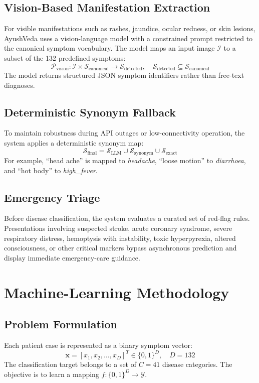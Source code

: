 \documentclass[conference]{IEEEtran}
\begin{document}
\subsection{Vision-Based Manifestation Extraction}
For visible manifestations such as rashes, jaundice, ocular redness, or skin lesions, AyushVeda uses a vision-language model with a constrained prompt restricted to the canonical symptom vocabulary. The model maps an input image $\mathcal{I}$ to a subset of the 132 predefined symptoms:
\begin{equation}
\mathcal{P}_{\text{vision}}: \mathcal{I} \times \mathcal{S}_{\text{canonical}} \rightarrow \mathcal{S}_{\text{detected}}, \quad \mathcal{S}_{\text{detected}} \subseteq \mathcal{S}_{\text{canonical}}
\end{equation}
The model returns structured JSON symptom identifiers rather than free-text diagnoses.

\subsection{Deterministic Synonym Fallback}
To maintain robustness during API outages or low-connectivity operation, the system applies a deterministic synonym map:
\begin{equation}
\mathcal{S}_{\text{final}} = \mathcal{S}_{\text{LLM}} \cup \mathcal{S}_{\text{synonym}} \cup \mathcal{S}_{\text{exact}}
\end{equation}
For example, ``head ache'' is mapped to \textit{headache}, ``loose motion'' to \textit{diarrhoea}, and ``hot body'' to \textit{high\_fever}.

\subsection{Emergency Triage}
Before disease classification, the system evaluates a curated set of red-flag rules. Presentations involving suspected stroke, acute coronary syndrome, severe respiratory distress, hemoptysis with instability, toxic hyperpyrexia, altered consciousness, or other critical markers bypass asynchronous prediction and display immediate emergency-care guidance.

\section{Machine-Learning Methodology}

\subsection{Problem Formulation}
Each patient case is represented as a binary symptom vector:
\begin{equation}
\mathbf{x} = [x_1, x_2, \dots, x_D]^T \in \{0,1\}^D, \quad D = 132
\end{equation}
The classification target belongs to a set of $C = 41$ disease categories. The objective is to learn a mapping $f: \{0,1\}^D \rightarrow \mathcal{Y}$.
\end{document}
